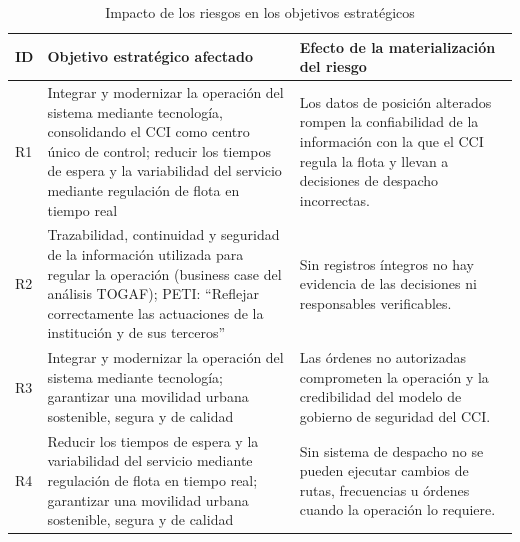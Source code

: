 \begin{table}[H]
    \centering
    \caption{Impacto de los riesgos en los objetivos estratégicos}
    \label{tab:impacto-objetivos}
    \small
    \renewcommand{\arraystretch}{1.25}

    \begin{tabularx}{\textwidth}{
            @{}
            >{\centering\arraybackslash}p{0.8cm}
            >{\raggedright\arraybackslash}p{7.3cm}
            >{\raggedright\arraybackslash}X
            @{}
        }
        \toprule
        \textbf{ID}                                                                                                                                                                                                                    &
        \textbf{Objetivo estratégico afectado}                                                                                                                                                                                         &
        \textbf{Efecto de la materialización del riesgo}                                                                                                                                                                                 \\
        \midrule

        R1 &
        Integrar y modernizar la operación del sistema mediante tecnología, consolidando el CCI como centro único de control; reducir los tiempos de espera y la variabilidad del servicio mediante regulación de flota en tiempo real &
        Los datos de posición alterados rompen la confiabilidad de la información con la que el CCI regula la flota y llevan a decisiones de despacho incorrectas. \\

        \midrule

        R2 &
        Trazabilidad, continuidad y seguridad de la información utilizada para regular la operación (business case del análisis TOGAF); PETI: \enquote{Reflejar correctamente las actuaciones de la institución y de sus terceros} &
        Sin registros íntegros no hay evidencia de las decisiones ni responsables verificables. \\

        \midrule

        R3 &
        Integrar y modernizar la operación del sistema mediante tecnología; garantizar una movilidad urbana sostenible, segura y de calidad &
        Las órdenes no autorizadas comprometen la operación y la credibilidad del modelo de gobierno de seguridad del CCI. \\

        \midrule

        R4 &
        Reducir los tiempos de espera y la variabilidad del servicio mediante regulación de flota en tiempo real; garantizar una movilidad urbana sostenible, segura y de calidad &
        Sin sistema de despacho no se pueden ejecutar cambios de rutas, frecuencias u órdenes cuando la operación lo requiere. \\

        \bottomrule
    \end{tabularx}
\end{table}
